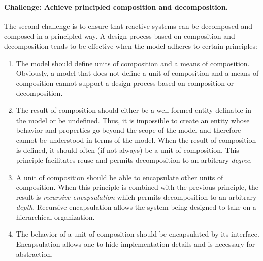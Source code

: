 \paragraph{Challenge:  Achieve principled composition and decomposition.}
The second challenge is to ensure that reactive systems can be decomposed and composed in a principled way.
A design process based on composition and decomposition tends to be effective when the model adheres to certain principles:
\begin{enumerate}
\item The model should define units of composition and a means of composition.
Obviously, a model that does not define a unit of composition and a means of composition cannot support a design process based on composition or decomposition.

\item The result of composition should either be a well-formed entity definable in the model or be undefined.
Thus, it is impossible to create an entity whose behavior and properties go beyond the scope of the model and therefore cannot be understood in terms of the model.
When the result of composition is defined, it should often (if not always) be a unit of composition.
This principle facilitates reuse and permits decomposition to an arbitrary \emph{degree}.

\item A unit of composition should be able to encapsulate other units of composition.
When this principle is combined with the previous principle, the result is \emph{recursive encapsulation} which permits decomposition to an arbitrary \emph{depth}.
Recursive encapsulation allows the system being designed to take on a hierarchical organization.

\item The behavior of a unit of composition should be encapsulated by its interface.
Encapsulation allows one to hide implementation details and is necessary for abstraction.



\end{enumerate}
